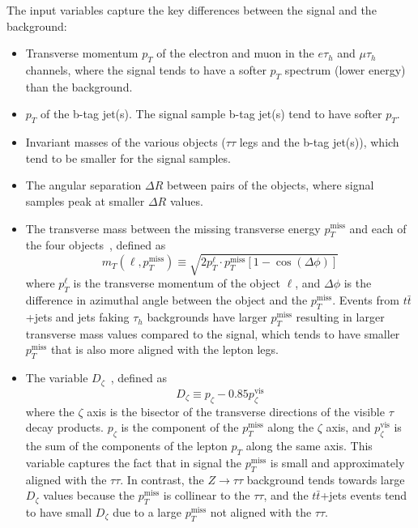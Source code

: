 The input variables capture the key differences between the signal and the background:
\begin{itemize}
    \item Transverse momentum $p_{T}$ of the electron and muon in the $e\tau_{h}$ and $\mu\tau_{h}$ channels, where the signal tends to have a softer $p_{T}$ spectrum (lower energy) than the background.
    \item $p_{T}$ of the b-tag jet(s). The signal sample b-tag jet(s) tend to have softer $p_{T}$.
    \item Invariant masses of the various objects ($\tau\tau$ legs and the b-tag jet(s)), which tend to be smaller for the signal samples.
    \item The angular separation $\Delta R$ between pairs of the objects, where signal samples peak at smaller $\Delta R$ values.
    
    \item The transverse mass between the missing transverse energy $p_{T}^{\text{miss}}$ and each of the four objects~\cite{CMS-HIG-17-024}, defined as
        \begin{equation}
            m_{T}(\ell, p_{T}^{\text{miss}}) \equiv \sqrt{2 p_{T}^{\ell} \cdot p_{T}^{\text{miss}} [1 - \cos(\Delta \phi)]}
        \end{equation}
    where $p_{T}^\ell$ is the transverse momentum of the object $\ell$, and $\Delta \phi$ is the difference in azimuthal angle between the object and the $p_{T}^{\text{miss}}$. Events from $t\bar{t}$+jets and jets faking $\tau_{h}$ backgrounds have larger $p_{T}^{\text{miss}}$ resulting in larger transverse mass values compared to the signal, which tends to have smaller $p_{T}^{\text{miss}}$ that is also more aligned with the lepton legs.

    \item The variable $D_{\zeta}$~\cite{CMS-HIG-17-024}, defined as
        \begin{equation}
            D_{\zeta} \equiv p_{\zeta} - 0.85 p_{\zeta}^{\text{vis}}
        \end{equation}
        where the $\zeta$ axis is the bisector of the transverse directions of the visible $\tau$ decay products. $p_{\zeta}$ is the component of the $p_{T}^{\text{miss}}$ along the $\zeta$ axis, and $p_{\zeta}^{\text{vis}}$ is the sum of the components of the lepton $p_{T}$ along the same axis. This variable captures the fact that in signal the $p_{T}^\text{miss}$ is small and approximately aligned with the $\tau\tau$. In contrast, the $Z \rightarrow \tau\tau$ background tends towards large $D_{\zeta}$ values because the $p_{T}^{\text{miss}}$ is collinear to the $\tau\tau$, and the $t\bar{t}$+jets events tend to have small $D_{\zeta}$ due to a large $p_{T}^{\text{miss}}$ not aligned with the $\tau\tau$.


\end{itemize}
